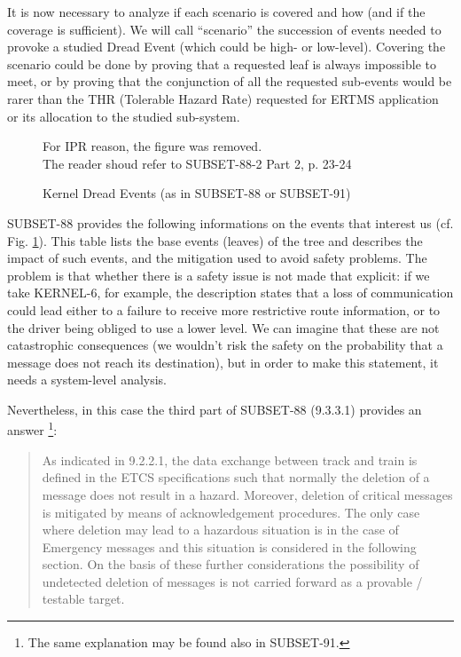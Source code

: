 \documentclass{template/openetcs_article}
\begin{document}
It is now necessary to analyze if each scenario is covered and how (and if the coverage is sufficient).
We will call ``scenario'' the succession of events needed to provoke a studied Dread Event (which could
be high- or low-level). Covering the scenario could be done by proving that a requested leaf is always 
impossible to meet, or by proving that the conjunction of all the requested sub-events would be rarer 
than the THR (Tolerable Hazard Rate) requested for ERTMS application or its allocation to the studied 
sub-system.

\begin{figure}
  \centering
  {For IPR reason, the figure was removed. \\
  The reader shoud refer to SUBSET-88-2 Part 2, p. 23-24}
  \caption{Kernel Dread Events (as in SUBSET-88 or SUBSET-91)}
\label{tab:kernel_evt}
\end{figure}

SUBSET-88 provides the following informations on the events that interest us 
(cf. Fig. \ref{tab:kernel_evt}). This table lists the base events (leaves) of the tree
and describes the impact of such events, and the mitigation used to avoid safety problems.
The problem is that whether there is a safety issue is not made that explicit: if we take
KERNEL-6, for example, the description states that a loss of communication could lead either to a 
failure to receive more restrictive route information, or to the driver being obliged to use a lower 
level. We can imagine that these are not catastrophic consequences (we wouldn't risk the safety on 
the probability that a message does not reach its destination), but in order to make this statement,
it needs a system-level analysis. 

Nevertheless, in this case the third part of SUBSET-88 (9.3.3.1) provides an answer \footnote{
The same explanation may be found also in SUBSET-91.}:
\begin{quote}
As indicated in 9.2.2.1, the data exchange between track and train is defined in the
ETCS specifications such that normally the deletion of a message does not result in a
hazard. Moreover, deletion of critical messages is mitigated by means of
acknowledgement procedures. The only case where deletion may lead to a hazardous
situation is in the case of Emergency messages and this situation is considered in the
following section. On the basis of these further considerations the possibility of
undetected deletion of messages is not carried forward as a provable / testable target.
\end{quote}
\end{document}
